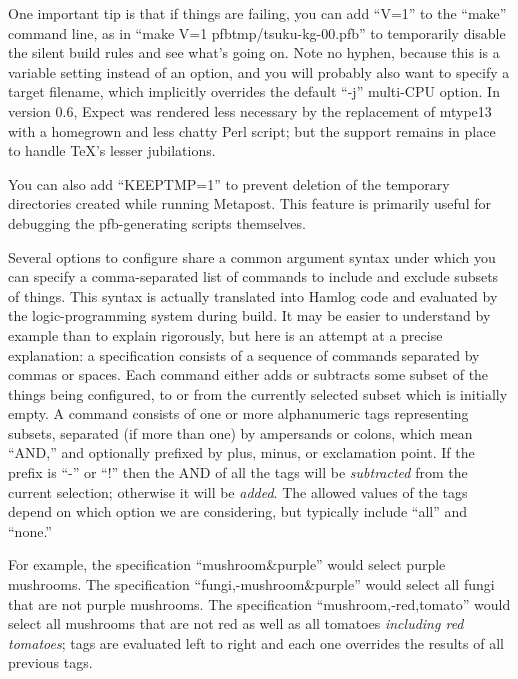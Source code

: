 \documentclass[14pt]{extarticle}
\begin{document}
One important tip is that if things are failing, you can add ``V=1'' to the
``make'' command line, as in ``make V=1 pfbtmp/tsuku-kg-00.pfb'' to
temporarily disable the silent build rules and see what's going on.  Note no
hyphen, because this is a variable setting instead of an option, and you
will probably also want to specify a target filename, which implicitly
overrides the default ``-j'' multi-CPU option.  In version 0.6, Expect was
rendered less necessary by the replacement of mtype13 with a homegrown and
less chatty Perl script; but the support remains in place to handle \TeX's
lesser jubilations.

You can also add ``KEEPTMP=1'' to prevent deletion of the temporary
directories created while running Metapost.  This feature is primarily
useful for debugging the pfb-generating scripts themselves.

Several options to configure share a common argument syntax under which you
can specify a comma-separated list of commands to include and exclude
subsets of things.  This syntax is actually translated into Hamlog code and
evaluated by the logic-programming system during build.  It may be easier
to understand by example than to explain rigorously, but here is an attempt
at a precise explanation: a specification consists of a sequence of commands
separated by commas or spaces.  Each command either adds or subtracts some
subset of the things being configured, to or from the currently selected
subset which is initially empty.  A command consists of one or more
alphanumeric tags representing subsets, separated (if more than one) by
ampersands or colons, which mean ``AND,'' and optionally prefixed by plus,
minus, or exclamation point.  If the prefix is ``-'' or ``!'' then the AND
of all the tags will be \emph{subtracted} from the current selection;
otherwise it will be \emph{added}.  The allowed values of the tags depend on
which option we are considering, but typically include ``all'' and ``none.''

For example, the specification ``mushroom\&purple'' would select purple
mushrooms.  The specification ``fungi,-mushroom\&purple'' would select all
fungi that are not purple mushrooms.  The specification
``mushroom,-red,tomato'' would select all mushrooms that are not red as well
as all tomatoes \emph{including red tomatoes}; tags are evaluated left to
right and each one overrides the results of all previous tags.
\end{document}
